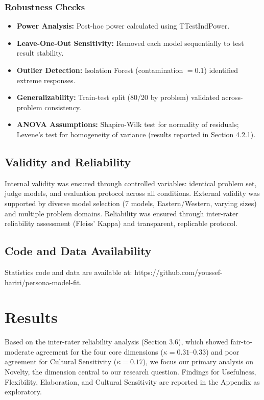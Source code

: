 \documentclass{article}
\begin{document}
\subsubsection{Robustness Checks}

\begin{itemize}
    \item \textbf{Power Analysis:} Post-hoc power calculated using TTestIndPower.
    \item \textbf{Leave-One-Out Sensitivity:} Removed each model sequentially to test result stability.
    \item \textbf{Outlier Detection:} Isolation Forest (contamination $= 0.1$) identified extreme responses.
    \item \textbf{Generalizability:} Train-test split (80/20 by problem) validated across-problem consistency.
    \item \textbf{ANOVA Assumptions:} Shapiro-Wilk test for normality of residuals; Levene's test for homogeneity of variance (results reported in Section 4.2.1).
\end{itemize}

\subsection{Validity and Reliability}

Internal validity was ensured through controlled variables: identical problem set, judge models, and evaluation protocol across all conditions. External validity was supported by diverse model selection (7 models, Eastern/Western, varying sizes) and multiple problem domains. Reliability was ensured through inter-rater reliability assessment (Fleiss' Kappa) and transparent, replicable protocol.

\subsection{Code and Data Availability}

 Statistics code and data are available at: https://github.com/youssef-hariri/persona-model-fit.

\section{Results}

Based on the inter-rater reliability analysis (Section 3.6), which showed fair-to-moderate agreement for the four core dimensions (\(\kappa = 0.31\)--\(0.33\)) and poor agreement for Cultural Sensitivity (\(\kappa = 0.17\)), we focus our primary analysis on Novelty, the dimension central to our research question. Findings for Usefulness, Flexibility, Elaboration, and Cultural Sensitivity are reported in the Appendix as exploratory.
\end{document}
